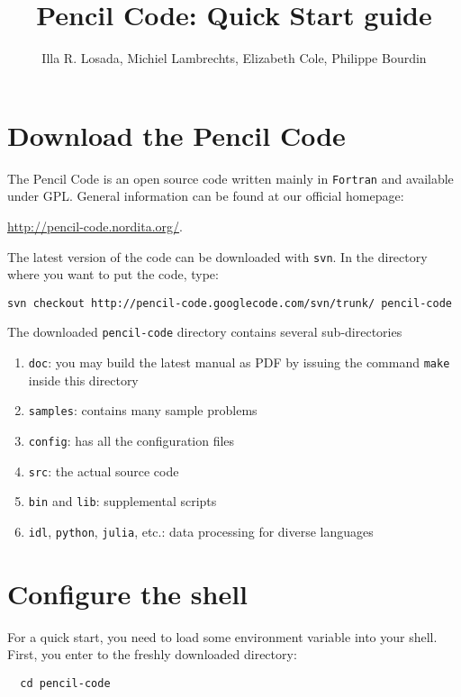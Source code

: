 \documentclass[a4paper,12pt]{article}
\title{Pencil Code: Quick Start guide}
\author{Illa R. Losada, Michiel Lambrechts, Elizabeth Cole, Philippe Bourdin}
\begin{document}
\maketitle

\tableofcontents

\newpage


\section{Download the Pencil Code}
The Pencil Code is an open source code written mainly in \verb|Fortran| and available under GPL.
General information can be found at our official homepage:

\url{http://pencil-code.nordita.org/}.

The latest version of the code can be downloaded with \verb|svn|. In the
directory where you want to put the code, type:
\begin{verbatim}
svn checkout http://pencil-code.googlecode.com/svn/trunk/ pencil-code
\end{verbatim}

The downloaded \verb|pencil-code| directory contains several sub-directories
\begin{enumerate}
  \item \verb|doc|: you may build the latest manual as PDF by issuing the command \verb|make| inside this directory
  \item \verb|samples|: contains many sample problems
  \item \verb|config|: has all the configuration files
  \item \verb|src|: the actual source code
  \item \verb|bin| and \verb|lib|: supplemental scripts
  \item \verb|idl|, \verb|python|, \verb|julia|, etc.: data processing for diverse languages
\end{enumerate}


\section{Configure the shell}

For a quick start, you need to load some environment variable into your shell.
First, you enter to the freshly downloaded directory:

\begin{verbatim}
  cd pencil-code
\end{verbatim}
\end{document}

